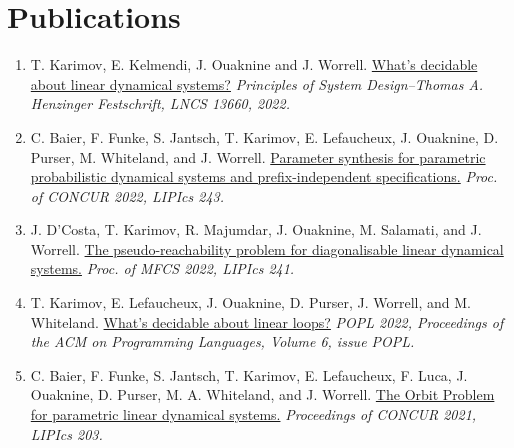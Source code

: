 \documentclass{article}
\begin{document}
	\section*{Publications}
	\begin{enumerate}
		\item T. Karimov, E. Kelmendi, J. Ouaknine and J. Worrell.
		\newline \href{https://doi.org/10.1007/978-3-031-22337-2_2}{What's decidable about linear dynamical systems?}
		\newline\emph{Principles of System Design--Thomas A. Henzinger Festschrift, LNCS 13660, 2022.}
		
		\item C. Baier, F. Funke, S. Jantsch, T. Karimov, E. Lefaucheux, J. Ouaknine, D. Purser, M. Whiteland, and J. Worrell. 
		\newline \href{https://drops.dagstuhl.de/opus/volltexte/2022/17073/}{Parameter synthesis for parametric probabilistic dynamical systems and prefix-independent specifications.}
		\newline\emph{Proc. of CONCUR 2022, LIPIcs 243.}
		
		\item J. D'Costa, T. Karimov, R. Majumdar, J. Ouaknine, M. Salamati, and J. Worrell. 
		\newline \href{https://drops.dagstuhl.de/opus/volltexte/2022/16838/}{The pseudo-reachability problem for diagonalisable linear dynamical systems.}
		\newline\emph{Proc. of MFCS 2022, LIPIcs 241.}
		
		\item T. Karimov, E. Lefaucheux, J. Ouaknine, D. Purser, J. Worrell, and M. Whiteland. 
		\newline \href{https://dl.acm.org/doi/10.1145/3498727}{What's decidable about linear loops?}
		\newline\emph{POPL 2022, Proceedings of the ACM on Programming Languages, Volume 6, issue POPL.}
		
		\item C. Baier, F. Funke, S. Jantsch, T. Karimov, E. Lefaucheux, F. Luca, J. Ouaknine, D. Purser, M. A. Whiteland, and J. Worrell.
		\newline \href{https://people.mpi-sws.org/~joel/publications/semialgebraic-model-checking-LDS21abs.html}{The Orbit Problem for parametric linear dynamical systems.}
		\newline \emph{Proceedings of CONCUR 2021, LIPIcs 203.}
		

\end{enumerate}
\end{document}
